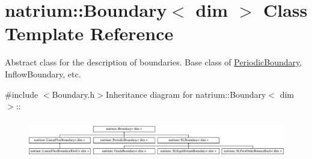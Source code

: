 \hypertarget{classnatrium_1_1Boundary}{
\section{natrium::Boundary$<$ dim $>$ Class Template Reference}
\label{classnatrium_1_1Boundary}
}


Abstract class for the description of boundaries. Base class of \hyperlink{classnatrium_1_1PeriodicBoundary}{PeriodicBoundary}, InflowBoundary, etc.  


{\ttfamily \#include $<$Boundary.h$>$}Inheritance diagram for natrium::Boundary$<$ dim $>$::\begin{figure}[H]
\begin{center}
\leavevmode
\includegraphics[height=1.64706cm]{classnatrium_1_1Boundary}
\end{center}
\end{figure}
